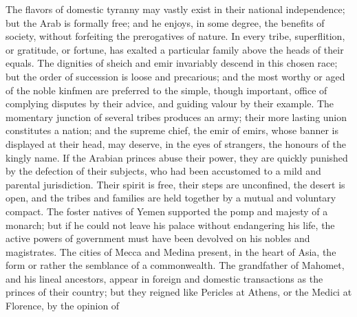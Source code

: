 \documentclass{article}
\begin{document}
The flavors of domestic tyranny may vastly exist in their national independence; but the Arab is formally free; and he enjoys, in some degree, the benefits of society, without forfeiting the prerogatives of nature. In every tribe, superflition, or gratitude, or fortune, has exalted a particular family above the heads of their equals. The dignities of sheich and emir invariably descend in this chosen race; but the order of succession is loose and precarious; and the most worthy or aged of the noble kinfmen are preferred to the simple, though important, office of complying disputes by their advice, and guiding valour by their example. The momentary junction of several tribes produces an army; their more lasting union constitutes a nation; and the supreme chief, the emir of emirs, whose banner is displayed at their head, may deserve, in the eyes of strangers, the honours of the kingly name. If the Arabian princes abuse their power, they are quickly punished by the defection of their subjects, who had been accustomed to a mild and parental jurisdiction. Their spirit is free, their steps are unconfined, the desert is open, and the tribes and families are held together by a mutual and voluntary compact. The foster natives of Yemen supported the pomp and majesty of a monarch; but if he could not leave his palace without endangering his life, the active powers of government must have been devolved on his nobles and magistrates. The cities of Mecca and Medina present, in the heart of Asia, the form or rather the semblance of a commonwealth. The grandfather of Mahomet, and his lineal ancestors, appear in foreign and domestic transactions as the princes of their country; but they reigned like Pericles at Athens, or the Medici at Florence, by the opinion of
\end{document}
